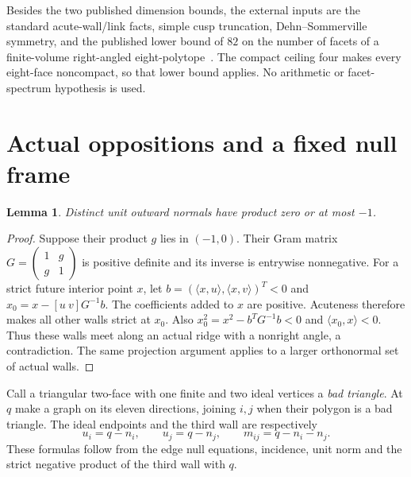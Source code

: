 \documentclass[11pt]{article}
\newtheorem{lemma}[theorem]{Lemma}
\newcommand{\ip}[2]{\langle #1,#2\rangle}
\begin{document}
Besides the two published dimension bounds, the external inputs are
the standard acute-wall/link facts, simple cusp truncation,
Dehn--Sommerville symmetry, and the published lower bound of $82$ on
the number of facets of a finite-volume right-angled eight-polytope~\cite[Sections 2--6]{Alex}.
The compact ceiling four makes every eight-face noncompact, so that
lower bound applies. No arithmetic or facet-spectrum hypothesis is used.

\section{Actual oppositions and a fixed null frame}
\begin{lemma}\label{lem:gap}
Distinct unit outward normals have product zero or at most $-1$.
\end{lemma}
\begin{proof}
Suppose their product $g$ lies in $(-1,0)$. Their Gram matrix
$G=\left(\begin{smallmatrix}1&g\\g&1\end{smallmatrix}\right)$
is positive definite and its inverse is entrywise nonnegative. For
a strict future interior point $x$, let
$b=(\ip{x}{u},\ip{x}{v})^T<0$ and
$x_0=x-[u\ v]G^{-1}b$. The coefficients added to $x$ are positive.
Acuteness therefore makes all other walls strict at $x_0$.
Also $x_0^2=x^2-b^TG^{-1}b<0$ and $\ip{x_0}{x}<0$.
Thus these walls meet along an actual ridge with a nonright angle,
a contradiction. The same projection argument applies to a larger
orthonormal set of actual walls.
\end{proof}

Call a triangular two-face with one finite and two ideal vertices a
\emph{bad triangle}. At $q$ make a graph on its eleven directions,
joining $i,j$ when their polygon is a bad triangle. The ideal
endpoints and the third wall are respectively
\begin{equation}\label{eq:bad}
 u_i=q-n_i,\qquad u_j=q-n_j,\qquad m_{ij}=q-n_i-n_j.
\end{equation}
These formulas follow from the edge null equations, incidence, unit
norm and the strict negative product of the third wall with $q$.
\end{document}
